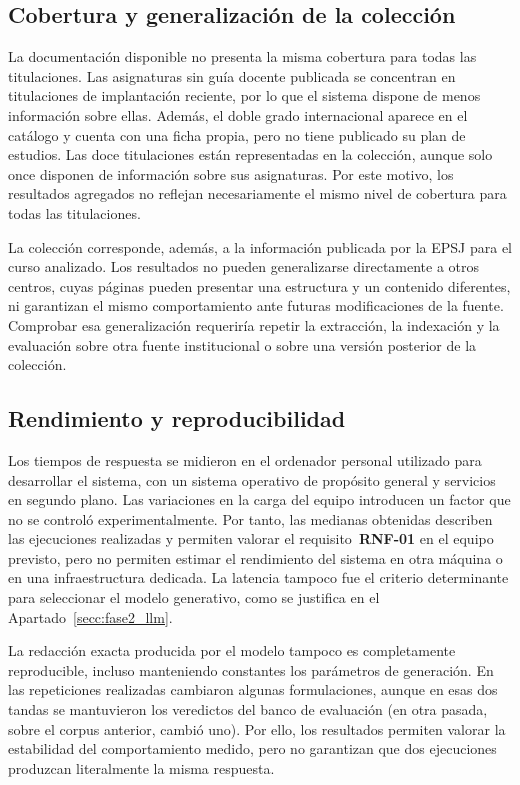 \subsection{Cobertura y generalización de la colección}
\label{secc:cobertura_generalizacion}

La documentación disponible no presenta la misma
cobertura para todas las titulaciones. Las asignaturas sin guía docente
publicada se concentran en titulaciones de implantación reciente, por lo que
el sistema dispone de menos información sobre ellas. Además, el doble grado
internacional aparece en el catálogo y cuenta con una ficha propia, pero no
tiene publicado su plan de estudios. Las doce titulaciones están representadas
en la colección, aunque solo once disponen de información sobre sus
asignaturas. Por este motivo, los resultados agregados no reflejan
necesariamente el mismo nivel de cobertura para todas las titulaciones.

La colección corresponde, además, a la información
publicada por la EPSJ para el curso analizado. Los resultados no pueden
generalizarse directamente a otros centros, cuyas páginas pueden presentar
una estructura y un contenido diferentes, ni garantizan el mismo
comportamiento ante futuras modificaciones de la fuente. Comprobar esa
generalización requeriría repetir la extracción, la indexación y la evaluación
sobre otra fuente institucional o sobre una versión posterior de la
colección.

\subsection{Rendimiento y reproducibilidad}



Los tiempos de respuesta se midieron en el ordenador
personal utilizado para desarrollar el sistema, con un sistema operativo de
propósito general y servicios en segundo plano. Las variaciones en la carga
del equipo introducen un factor que no se controló experimentalmente. Por
tanto, las medianas obtenidas describen las ejecuciones realizadas y permiten
valorar el requisito~\textbf{RNF-01} en el equipo previsto, pero no permiten
estimar el rendimiento del sistema en otra máquina o en una infraestructura
dedicada. La latencia tampoco fue el criterio determinante para seleccionar el
modelo generativo, como se justifica en el
Apartado~\ref{secc:fase2_llm}.

La redacción exacta producida por el modelo tampoco es
completamente reproducible, incluso manteniendo constantes los parámetros de
generación. En las repeticiones realizadas cambiaron algunas formulaciones,
aunque en esas dos tandas se mantuvieron los veredictos del banco de evaluación (en otra pasada, sobre el corpus anterior, cambió uno). Por ello, los
resultados permiten valorar la estabilidad del comportamiento medido, pero no
garantizan que dos ejecuciones produzcan literalmente la misma respuesta.

